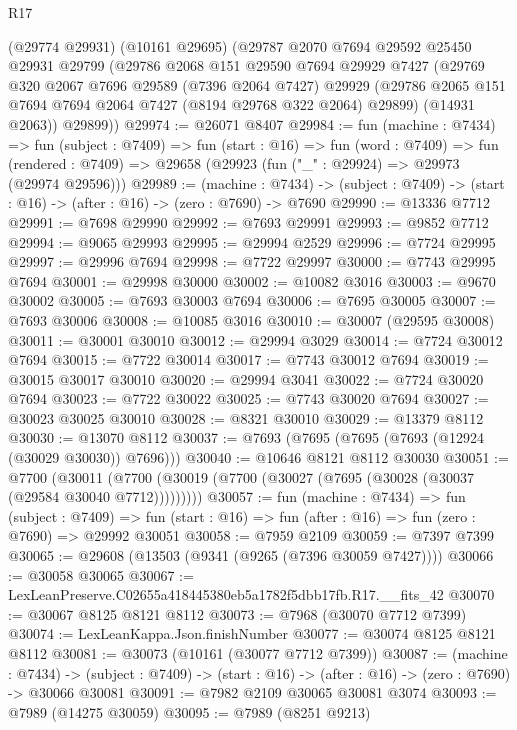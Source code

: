 \begin{lexlean}{R17}
\begin{coremodule}
    (@29774 @29931)
    (@10161 @29695)
    (@29787
      @2070
      @7694
      @29592
      @25450
      @29931
      @29799
      (@29786
        @2068
        @151
        @29590
        @7694
        @29929
        @7427
        (@29769
          @320
          @2067
          @7696
          @29589
          (@7396 @2064 @7427)
          @29929
          (@29786 @2065 @151 @7694 @7694 @2064 @7427 (@8194 @29768 @322 @2064) @29899)
          (@14931 @2063))
        @29899))
@29974 := @26071 @8407
@29984 := fun (machine : @7434) =>
  fun (subject : @7409) =>
  fun (start : @16) =>
  fun (word : @7409) =>
  fun (rendered : @7409) => @29658 (@29923 (fun ("_" : @29924) => @29973 (@29974 @29596)))
@29989 := (machine : @7434) ->
  (subject : @7409) -> (start : @16) -> (after : @16) -> (zero : @7690) -> @7690
@29990 := @13336 @7712
@29991 := @7698 @29990
@29992 := @7693 @29991
@29993 := @9852 @7712
@29994 := @9065 @29993
@29995 := @29994 @2529
@29996 := @7724 @29995
@29997 := @29996 @7694
@29998 := @7722 @29997
@30000 := @7743 @29995 @7694
@30001 := @29998 @30000
@30002 := @10082 @3016
@30003 := @9670 @30002
@30005 := @7693 @30003 @7694
@30006 := @7695 @30005
@30007 := @7693 @30006
@30008 := @10085 @3016
@30010 := @30007 (@29595 @30008)
@30011 := @30001 @30010
@30012 := @29994 @3029
@30014 := @7724 @30012 @7694
@30015 := @7722 @30014
@30017 := @7743 @30012 @7694
@30019 := @30015 @30017 @30010
@30020 := @29994 @3041
@30022 := @7724 @30020 @7694
@30023 := @7722 @30022
@30025 := @7743 @30020 @7694
@30027 := @30023 @30025 @30010
@30028 := @8321 @30010
@30029 := @13379 @8112
@30030 := @13070 @8112
@30037 := @7693 (@7695 (@7695 (@7693 (@12924 (@30029 @30030)) @7696)))
@30040 := @10646 @8121 @8112 @30030
@30051 := @7700
    (@30011 (@7700 (@30019 (@7700 (@30027 (@7695 (@30028 (@30037 (@29584 @30040 @7712)))))))))
@30057 := fun (machine : @7434) =>
  fun (subject : @7409) =>
  fun (start : @16) => fun (after : @16) => fun (zero : @7690) => @29992 @30051
@30058 := @7959 @2109
@30059 := @7397 @7399
@30065 := @29608 (@13503 (@9341 (@9265 (@7396 @30059 @7427))))
@30066 := @30058 @30065
@30067 := LexLeanPreserve.C02655a418445380eb5a1782f5dbb17fb.R17.__fits_42
@30070 := @30067 @8125 @8121 @8112
@30073 := @7968 (@30070 @7712 @7399)
@30074 := LexLeanKappa.Json.finishNumber
@30077 := @30074 @8125 @8121 @8112
@30081 := @30073 (@10161 (@30077 @7712 @7399))
@30087 := (machine : @7434) ->
  (subject : @7409) -> (start : @16) -> (after : @16) -> (zero : @7690) -> @30066 @30081
@30091 := @7982 @2109 @30065 @30081 @3074
@30093 := @7989 (@14275 @30059)
@30095 := @7989 (@8251 @9213)

\end{coremodule}
\end{lexlean}
